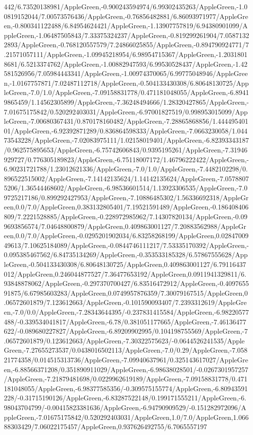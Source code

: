{\begin{tikzternal}
442/6.73520138981/AppleGreen,-0.900243594974/6.99302435263/AppleGreen,-1.00819152044/7.00573576436/AppleGreen,-0.76856482881/6.86093971977/AppleGreen,-0.800341122488/6.84954624421/AppleGreen,-1.13907757819/6.94380901099/AppleGreen,-1.06487505843/7.33375324237/AppleGreen,-0.819299261904/7.05871322893/AppleGreen,-0.768120557579/7.24866025855/AppleGreen,-0.894790924771/7.21571057111/AppleGreen,-1.09945218954/6.98954715367/AppleGreen,-1.20318018681/6.5213374762/AppleGreen,-1.00882947593/6.99530528437/AppleGreen,-1.42581526956/7.05984443341/AppleGreen,-1.00974370065/6.99775048946/AppleGreen,-1.0167757871/7.02487112718/AppleGreen,-0.504133430308/6.80648130725/AppleGreen,-7.0/1.0/AppleGreen,-7.09158831778/0.471181048055/AppleGreen,-6.89419865459/1.14562305899/AppleGreen,-7.36248494666/1.28320427865/AppleGreen,-7.01675175842/0.520292403031/AppleGreen,-6.97001827519/0.998953015099/AppleGreen,-7.00680367431/0.870178160482/AppleGreen,-7.28865868856/1.44449540101/AppleGreen,-6.92392871289/0.836864598333/AppleGreen,-7.0663230058/1.04473543228/AppleGreen,-7.02083975111/1.02158019401/AppleGreen,-6.82393343187/0.962575895653/AppleGreen,-6.75742606843/0.9395195261/AppleGreen,-7.31946929727/0.776305189823/AppleGreen,-6.75118007172/1.46796222422/AppleGreen,-6.90231721788/1.23012621336/AppleGreen,-7.0/1.0/AppleGreen,-7.4482102298/0.896522515002/AppleGreen,-7.14142135624/1.14142135624/AppleGreen,-7.05788075206/1.36544468602/AppleGreen,-6.98536601514/1.13923306535/AppleGreen,-7.09725217186/0.899292427953/AppleGreen,-7.10886485302/1.56336692318/AppleGreen,0.0/7.0/AppleGreen,0.383132805401/7.19521591489/AppleGreen,-0.186408406809/7.2221528885/AppleGreen,-0.228972985962/7.14307820134/AppleGreen,-0.099693856574/7.04648800879/AppleGreen,0.409863001127/7.20883562988/AppleGreen,0.0/7.0/AppleGreen,-0.0295201902034/6.83258268199/AppleGreen,0.0284700949613/7.10625184089/AppleGreen,-0.0844746111217/7.53335170392/AppleGreen,-0.095385467562/6.84735134269/AppleGreen,-0.353533185328/6.57867555628/AppleGreen,-0.504133430308/6.80648130725/AppleGreen,0.409863001127/6.79116437012/AppleGreen,0.246044877527/7.36477653192/AppleGreen,0.0911941329811/6.93848878062/AppleGreen,-0.297370700427/6.83516472912/AppleGreen,-0.409765591875/6.67985603283/AppleGreen,0.0749957876359/7.30079167515/AppleGreen,0.06572601879/7.123612663/AppleGreen,-0.101590093407/7.2393312619/AppleGreen,-7.0/0.0/AppleGreen,-7.28343644395/-0.237831415584/AppleGreen,-6.98220577488/-0.339534041817/AppleGreen,-6.78/0.381051177665/AppleGreen,-7.46136477622/-0.089680227827/AppleGreen,-6.89209902995/0.104198755569/AppleGreen,-7.06572601879/0.123612663/AppleGreen,-7.30322575623/-0.0644526241535/AppleGreen,-7.27655273537/0.0438016502113/AppleGreen,-7.0/0.29/AppleGreen,-7.05821774358/0.014515313736/AppleGreen,-7.09940637961/0.325143617027/AppleGreen,-6.88566371208/0.351890911029/AppleGreen,-6.98638028501/-0.0267301957257/AppleGreen,-7.21879481698/0.0229962619189/AppleGreen,-7.09158831778/0.471181048055/AppleGreen,-6.98377585356/-0.309575155774/AppleGreen,-6.80943591228/-0.31715190126/AppleGreen,-6.83287522148/0.199171555211/AppleGreen,-6.98043704799/-0.00415823381636/AppleGreen,-6.94790909529/-0.151282972096/AppleGreen,-7.01675175842/0.520292403031/AppleGreen,1.0/7.0/AppleGreen,1.06688303429/7.06022175457/AppleGreen,0.937626492755/6.7065557197
\end{tikzternal}}

